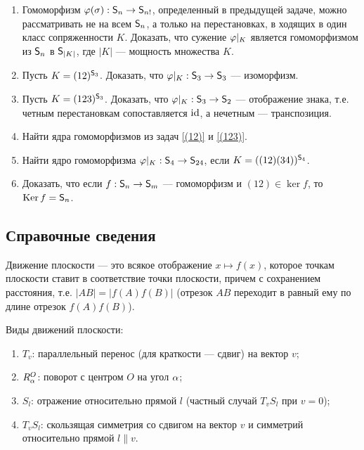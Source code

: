 \begin{enumerate}
\item Гомоморфизм $\varphi(\sigma):{\mathsf{S}}_n\to{\mathsf{S}}_{n!}$, определенный в предыдущей задаче, можно рассматривать не на всем ${\mathsf{S}}_n$, а только на перестановках, в ходящих в один класс сопряженности $K$. Доказать, что сужение $\varphi|_K$ является гомоморфизмом из ${\mathsf{S}}_n$ в ${\mathsf{S}}_{|K|}$, где $|K|$ --- мощность множества $K$.

\item Пусть $K=(12)^{{\mathsf{S}}_3}$. Доказать, что $\varphi|_K:{\mathsf{S}}_3\to{\mathsf{S}}_3$ --- изоморфизм.\label{(12)}

\item Пусть $K=(123)^{{\mathsf{S}}_3}$. Доказать, что $\varphi|_K:{\mathsf{S}}_3\to{\mathsf{S}}_2$ --- отображение знака, т.е. четным перестановкам сопоставляется $\mathrm{id}$, а нечетным --- транспозиция. \label{(123)}

\item Найти ядра гомоморфизмов из задач \ref{(12)} и \ref{(123)}.

\item Найти ядро гомоморфизма $\varphi|_K:{\mathsf{S}}_4\to{\mathsf{S}}_{24}$, если $K=((12)(34))^{{\mathsf{S}}_4}$.

\item Доказать, что если $f:{\mathsf{S}}_n\to{\mathsf{S}}_m$ --- гомоморфизм и $(12)\in\ker f$, то $\mathop{\mathrm{Ker}} f={\mathsf{S}}_n$.
\end{enumerate}

\subsection*{Справочные сведения}

Движение плоскости --- это всякое отображение $x\mapsto f(x)$, которое точкам плоскости ставит в соответствие точки плоскости, причем с сохранением расстояния, т.е. $|AB|=|f(A)f(B)|$ (отрезок $AB$ переходит в равный ему по длине отрезок $f(A)f(B)$).

Виды движений плоскости:
\begin{enumerate}
\item $T_v$: параллельный перенос (для краткости --- сдвиг) на вектор $v$;
\item $R_\alpha^O$: поворот с центром $O$ на угол $\alpha$;
\item $S_l$: отражение относительно прямой $l$ (частный случай $T_vS_l$ при $v=0$);
\item $T_vS_l$: скользящая симметрия со сдвигом на вектор $v$ и симметрий относительно прямой $l\parallel v$.
\end{enumerate}




